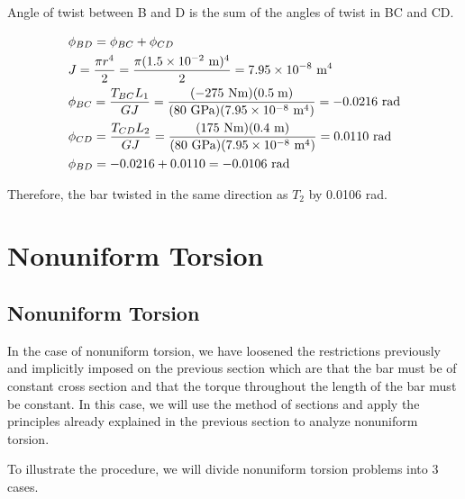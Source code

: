 \documentclass[
fontsize=10pt,
a4paper,
twosides=false,
open=any,
svgnames,
]{kaobook} %
\begin{document}
\begin{example}
Angle of twist between B and D is the sum of the angles of twist in BC and CD.

\[\begin{gathered}
  \phi_{BD} = \phi_{BC} + \phi_{CD} \hfill \\
  J = \frac{\pi r^4}{2} = \frac{\pi (1.5 \times 10^{-2}\text{ m})^4}{2} = 7.95 \times 10^{-8}\text{ m}^4 \hfill \\
  \phi_{BC} = \frac{T_{BC}L_1}{GJ} = \frac{( - 275\text{ Nm})(0.5\;{\text{m}})}{(80\text{ GPa})(7.95 \times 10^{-8}\text{ m}^4)} =  - 0.0216\text{ rad} \hfill \\
  \phi_{CD} = \frac{T_{CD}L_2}{GJ} = \frac{(175\text{ Nm})(0.4\text{ m})}{(80\text{ GPa})(7.95 \times 10^{-8}\text{ m}^4)} = 0.0110\text{ rad} \hfill \\
  \phi_{BD} =  - 0.0216 + 0.0110 =  - 0.0106\text{ rad} \hfill \\ 
\end{gathered} \]

Therefore, the bar twisted in the same direction as $T_2$ by 0.0106 rad.
\end{example}

\section{Nonuniform Torsion}

\subsection{Nonuniform Torsion}

In the case of nonuniform torsion, we have loosened the restrictions previously and implicitly imposed on the previous section which are that the bar must be of constant cross section and that the torque throughout the length of the bar must be constant. In this case, we will use the method of sections and apply the principles already explained in the previous section to analyze nonuniform torsion.

To illustrate the procedure, we will divide nonuniform torsion problems into 3 cases.
\end{document}
